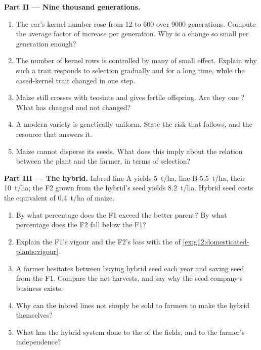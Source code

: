 \begin{problem}
\medskip
\noindent\textbf{Part II --- Nine thousand generations.}
\begin{enumerate}[resume]
  \item The ear's kernel number rose from 12 to 600 over 9000
        generations. Compute the average factor of increase per
        generation. Why is a change so small per generation enough?
  \item The number of kernel rows is controlled by many  of
        small effect. Explain why such a trait responds to selection
        gradually and for a long time, while the cased-kernel trait
        changed in one step.
  \item Maize still crosses with teosinte and gives fertile
        offspring. Are they one ? What has 
        changed and not changed?
  \item A modern variety is genetically uniform. State the risk that
        follows, and the resource that answers it.
  \item Maize cannot disperse its seeds. What does this imply about
        the relation between the plant and the farmer, in terms of
        selection?
\end{enumerate}

\medskip
\noindent\textbf{Part III --- The hybrid.}
Inbred line A yields \qty{5}{t/ha}, line B \qty{5.5}{t/ha}, their  \qty{10}{t/ha}; the F2 grown from the hybrid's seed yields
\qty{8.2}{t/ha}. Hybrid seed costs the equivalent of \qty{0.4}{t/ha}
of maize.
\begin{enumerate}[resume]
  \item By what percentage does the F1 exceed the better parent? By
        what percentage does the F2 fall below the F1?
  \item Explain the F1's vigour and the F2's loss with the
         of \cref{ex:g12:domesticated-plants:vigour}.
  \item A farmer hesitates between buying hybrid seed each year and
        saving seed from the F1. Compare the net harvests, and say why
        the seed company's business exists.
  \item Why can the inbred lines not simply be sold to farmers to make
        the hybrid themselves?
  \item What has the hybrid system done to the  of
        the fields, and to the farmer's independence?
\end{enumerate}


\end{problem}
